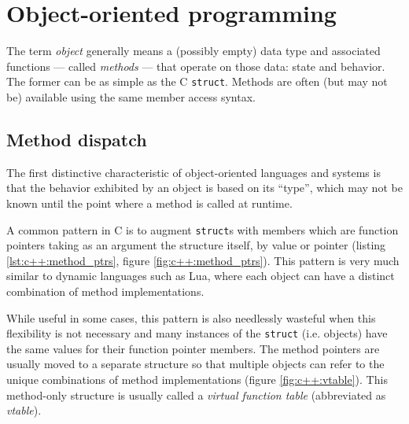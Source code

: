 \section{Object-oriented programming}

\label{sec:c++:oop}

The term \textit{object} generally means a (possibly empty) data type and
associated functions --- called \textit{methods} --- that operate on those data:
state and behavior\footnotemark.  The former can be as simple as the C
\texttt{struct}.  Methods are often (but may not be) available using the same
member access syntax.


\subsection{Method dispatch}

The first distinctive characteristic of object-oriented languages and systems is
that the behavior exhibited by an object is based on its ``type'', which may not
be known until the point where a method is called at runtime.

A common pattern in C is to augment \texttt{struct}s with members which are
function pointers taking as an argument the structure itself, by value or
pointer (listing \ref{lst:c++:method_ptrs}, figure \ref{fig:c++:method_ptrs}).
This pattern is very much similar to dynamic languages such as Lua, where each
object can have a distinct combination of method implementations.

While useful in some cases, this pattern is also needlessly wasteful when this
flexibility is not necessary and many instances of the \texttt{struct} (i.e.
objects) have the same values for their function pointer members.  The method
pointers are usually moved to a separate structure so that multiple objects can
refer to the unique combinations of method implementations (figure
\ref{fig:c++:vtable}).  This method-only structure is usually called a
\textit{virtual function table} (abbreviated as \textit{vtable}).

